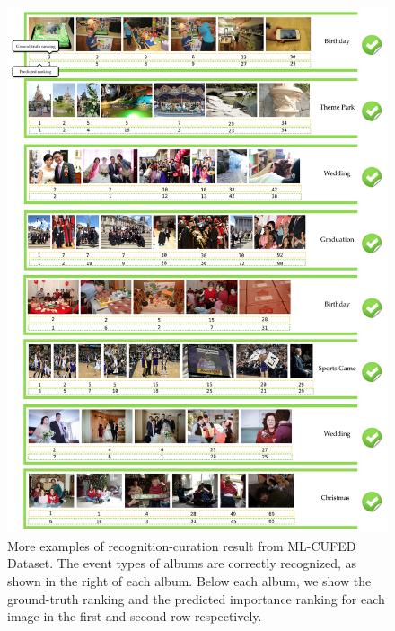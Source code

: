 \documentclass[runningheads]{llncs}
\begin{document}
\begin{figure}
\vspace{-0.1in}
\centering
\includegraphics[width=5in]{correct2}
\caption{More examples of recognition-curation result from ML-CUFED Dataset. The event types of albums are correctly recognized, as shown in the right of each album.  Below each album, we show the ground-truth ranking and the predicted importance ranking for each image in the first and second row respectively.}
\label{correct2}
\vspace{-0.2in}
\end{figure}
\end{document}
